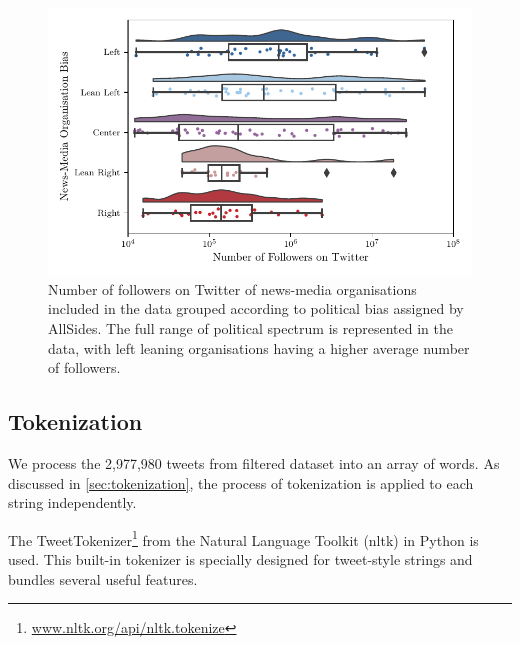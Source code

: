 \begin{figure}[!htbp]
	\centering
	\includegraphics[width=\textwidth]{chapter1/figs/number_of_follow_by_bias_raincloud}
	\caption{Number of followers on Twitter of news-media organisations included in the data grouped according to political bias assigned by AllSides. The full range of political spectrum is represented in the data, with left leaning organisations having a higher average number of followers. }
	\label{fig:data_number_of_follow_by_bias_raincloud}
\end{figure}

\subsection{Tokenization}

We process the 2,977,980 tweets from filtered dataset into an array of words. As discussed in \autoref{sec:tokenization}, the process of tokenization is applied to each string independently.

The TweetTokenizer\footnote{\url{www.nltk.org/api/nltk.tokenize}} from the Natural Language Toolkit (nltk) in Python is used. This built-in tokenizer is specially designed for tweet-style strings and bundles several useful features.

